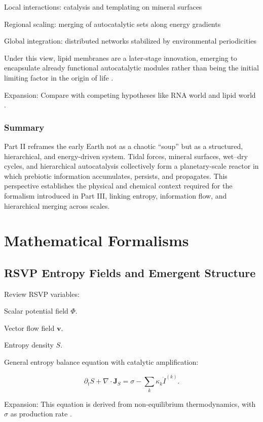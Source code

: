 \documentclass[openany]{book}
\begin{document}
Local interactions: catalysis and templating on mineral surfaces \citep{adam2012}

Regional scaling: merging of autocatalytic sets along energy gradients \citep{barge2022}

Global integration: distributed networks stabilized by environmental periodicities \citep{gan2024}

Under this view, lipid membranes are a later-stage innovation, emerging to encapsulate already functional autocatalytic modules rather than being the initial limiting factor in the origin of life \citep{deamer2017}.

Expansion: Compare with competing hypotheses like RNA world \citep{joyce1989} and lipid world \citep{deamer2017}.

\section{Summary}
Part II reframes the early Earth not as a chaotic “soup” but as a structured, hierarchical, and energy-driven system. Tidal forces, mineral surfaces, wet–dry cycles, and hierarchical autocatalysis collectively form a planetary-scale reactor in which prebiotic information accumulates, persists, and propagates. This perspective establishes the physical and chemical context required for the formalism introduced in Part III, linking entropy, information flow, and hierarchical merging across scales.

\part{Mathematical Formalisms}

\chapter{RSVP Entropy Fields and Emergent Structure}
Review RSVP variables:

Scalar potential field $\Phi$.

Vector flow field $\mathbf{v}$.

Entropy density $S$.

General entropy balance equation with catalytic amplification:

\[\partial_t S + \nabla \cdot \mathbf{J}_S = \sigma - \sum_{k} \kappa_k \dot{I}^{(k)}.\]

Expansion: This equation is derived from non-equilibrium thermodynamics, with $\sigma$ as production rate \citep{prigogine1984}.
\end{document}
